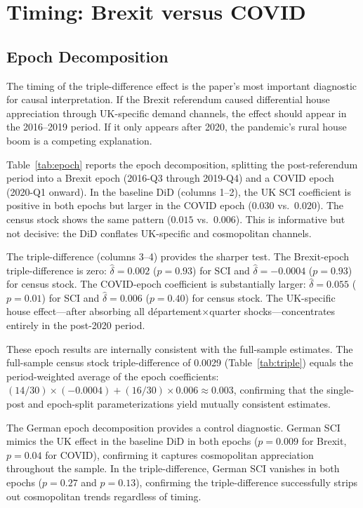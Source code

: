 \documentclass[12pt]{article}
\begin{document}
\section{Timing: Brexit versus COVID}\label{sec:timing}

\subsection{Epoch Decomposition}

The timing of the triple-difference effect is the paper's most important diagnostic for causal interpretation. If the Brexit referendum caused differential house appreciation through UK-specific demand channels, the effect should appear in the 2016--2019 period. If it only appears after 2020, the pandemic's rural house boom is a competing explanation.

Table~\ref{tab:epoch} reports the epoch decomposition, splitting the post-referendum period into a Brexit epoch (2016-Q3 through 2019-Q4) and a COVID epoch (2020-Q1 onward). In the baseline DiD (columns 1--2), the UK SCI coefficient is positive in both epochs but larger in the COVID epoch ($0.030$ vs.\ $0.020$). The census stock shows the same pattern ($0.015$ vs.\ $0.006$). This is informative but not decisive: the DiD conflates UK-specific and cosmopolitan channels.

The triple-difference (columns 3--4) provides the sharper test. The Brexit-epoch triple-difference is zero: $\hat{\delta} = 0.002$ ($p = 0.93$) for SCI and $\hat{\delta} = -0.0004$ ($p = 0.93$) for census stock. The COVID-epoch coefficient is substantially larger: $\hat{\delta} = 0.055$ ($p = 0.01$) for SCI and $\hat{\delta} = 0.006$ ($p = 0.40$) for census stock. The UK-specific house effect---after absorbing all d\'epartement$\times$quarter shocks---concentrates entirely in the post-2020 period.

These epoch results are internally consistent with the full-sample estimates. The full-sample census stock triple-difference of 0.0029 (Table~\ref{tab:triple}) equals the period-weighted average of the epoch coefficients: $(14/30) \times (-0.0004) + (16/30) \times 0.006 \approx 0.003$, confirming that the single-post and epoch-split parameterizations yield mutually consistent estimates.

The German epoch decomposition provides a control diagnostic. German SCI mimics the UK effect in the baseline DiD in both epochs ($p = 0.009$ for Brexit, $p = 0.04$ for COVID), confirming it captures cosmopolitan appreciation throughout the sample. In the triple-difference, German SCI vanishes in both epochs ($p = 0.27$ and $p = 0.13$), confirming the triple-difference successfully strips out cosmopolitan trends regardless of timing.
\end{document}
